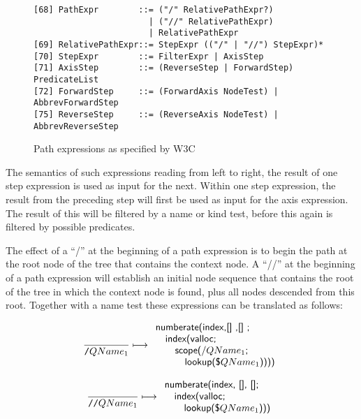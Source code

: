 \begin{figure}[h]
\begin{Verbatim}
[68] PathExpr        ::= ("/" RelativePathExpr?)
                       | ("//" RelativePathExpr)
                       | RelativePathExpr
[69] RelativePathExpr::= StepExpr (("/" | "//") StepExpr)*
[70] StepExpr        ::= FilterExpr | AxisStep
[71] AxisStep        ::= (ReverseStep | ForwardStep) PredicateList
[72] ForwardStep     ::= (ForwardAxis NodeTest) | AbbrevForwardStep
[75] ReverseStep     ::= (ReverseAxis NodeTest) | AbbrevReverseStep
\end{Verbatim}
\label{fig:trans:TD:pathEBNF}
\caption{Path expressions as specified by W3C}
\end{figure}
The semantics of such expressions reading from left to right, the result of one step expression is used as input
for the next. Within one step expression, the result from the preceding step will first be used as input for the
axis expression. The result of this will be filtered by a name or kind test, before this again is filtered by
possible predicates.

The effect of a ``/'' at the beginning of a path expression is to begin the path at the root node of the tree that
contains the context node. A ``//'' at the beginning of a path expression will establish an initial node sequence
that contains the root of the tree in which the context node is found, plus all nodes descended from this root.
Together with a name test these expressions can be translated as follows:

\begin{equation}
\frac{}{\mbox{\texttt{/}}QName_{1}}\longmapsto
\begin{array}{l}
\mbox{\textsf{numberate(index,[] ,[] ;}} \\ \quad
\mbox{\textsf{index(valloc;}} \\ \quad \quad
\mbox{\textsf{scope(/}}QName_{1}\mbox{\textsf{;}} \\ \quad\quad\quad
\mbox{\textsf{lookup(\$}}QName_{1}\mbox{\textsf{))))}}
\end{array}
\label{rule:trans:TD:sglSlash}
\end{equation}

\begin{equation}
\frac{}{\mbox{\texttt{//}}QName_{1}}\longmapsto
\begin{array}{l}
\mbox{\textsf{numberate(index, [], [];}} \\ \quad
\mbox{\textsf{index(valloc;}} \\ \quad \quad
\mbox{\textsf{lookup(\$}}QName_1\mbox{\textsf{)))}}
\end{array}
\label{rule:trans:TD:dblSlash}
\end{equation}

